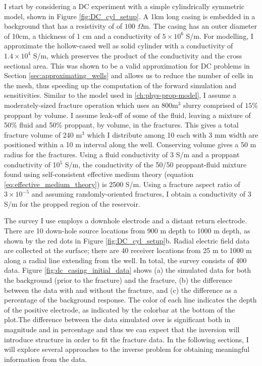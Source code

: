 I start by considering a DC experiment with a simple cylindrically symmetric model, shown in Figure \ref{fig:DC_cyl_setup}. A 1km long casing is embedded in a background that has a resistivity of of $100$ $\Omega$m. The casing has an outer diameter of 10cm, a thickness of 1 cm and a conductivity of $5 \times 10^6$ S/m. For modelling, I approximate the hollow-cased well as solid cylinder with a conductivity of $1.4 \times 10^4$ S/m, which preserves the product of the conductivity and the cross sectional area. This was shown to be a valid approximation for DC problems in Section \ref{sec:approximating_wells} and allows us to reduce the number of cells in the mesh, thus speeding up the computation of the forward simulation and sensitivities. Similar to the model used in \ref{ch:phys-prop-model}, I assume a moderately-sized fracture operation which uses an 800m$^3$ slurry comprised of $15\%$ proppant by volume. I assume leak-off of some of the fluid, leaving a mixture of 50\% fluid and 50\% proppant, by volume, in the fractures. This gives a total fracture volume of 240 m$^3$ which I distribute among 10 each with 3 mm width are positioned within a 10 m interval along the well. Conserving volume gives a 50 m radius for the fractures. Using a fluid conductivity of 3 S/m and a proppant conductivity of 10$^5$ S/m, the conductivity of the 50/50 proppant-fluid mixture found using self-consistent effective medium theory (equation \ref{eq:effective_medium_theory}) is 2500 S/m. Using a fracture aspect ratio of $3 \times 10^{-5}$ and assuming randomly-oriented fractures, I obtain a conductivity of 3 S/m for the propped region of the reservoir.




The survey I use employs a downhole electrode and a distant return electrode. There are 10 down-hole source locations from 900 m depth to 1000 m depth, as shown by the red dots in Figure \ref{fig:DC_cyl_setup}b. Radial electric field data are collected at the surface; there are 40 receiver locations from 25 m to 1000 m along a radial line extending from the well. In total, the survey consists of 400 data. Figure \ref{fig:dc_casing_initial_data} shows (a) the simulated data for both the background (prior to the fracture) and the fracture, (b) the difference between the data with and without the fracture, and (c) the difference as a percentage of the background response. The color of each line indicates the depth of the positive electrode, as indicated by the colorbar at the bottom of the plot.The difference between the data simulated over is significant both in magnitude and in percentage and thus we can expect that the inversion will introduce structure in order to fit the fracture data. In the following sections, I will explore several approaches to the inverse problem for obtaining meaningful information from the data.


